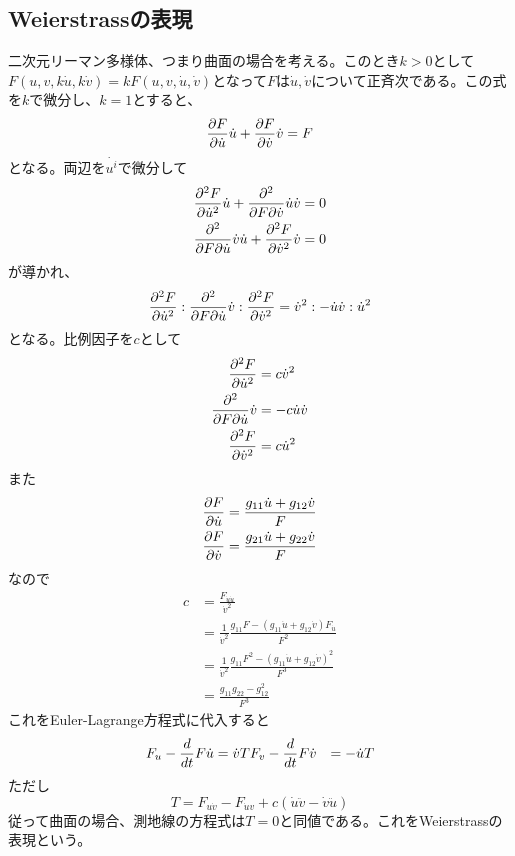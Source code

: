     \subsection{Weierstrassの表現}
        二次元リーマン多様体、つまり曲面の場合を考える。このとき$k > 0$として$F(u,v,k\dot{u},k\dot{v}) = kF(u,v,\dot{u},\dot{v})$となって$F$は$\dot{u},\dot{v}$について正斉次である。この式を$k$で微分し、$k = 1$とすると、
            \[\pd[F]{\dot{u}}\dot{u} + \pd[F]{\dot{v}}\dot{v} = F\]
        となる。両辺を$\dot{u^i}$で微分して
        \begin{align*}
            \pd[^2F]{\dot{u}^2}\dot{u}+\ppd{F}{\dot{v}}{\dot{u}}\dot{v} = 0\\
            \ppd{F}{\dot{u}}{\dot{v}}\dot{u}+\pd[^2F]{\dot{v}^2}\dot{v} = 0\\
        \end{align*}
        が導かれ、
            \[\pd[^2F]{\dot{u}^2} : \ppd{F}{\dot{u}}{\dot{v}} : \pd[^2F]{\dot{v}^2} = \dot{v}^2 : -\dot{u}\dot{v} : \dot{u}^2\]
        となる。比例因子を$c$として
        \begin{align*}
            \pd[^2F]{\dot{u}^2} &= c\dot{v}^2\\
            \ppd{F}{\dot{u}}{\dot{v}} &= -c\dot{u}\dot{v}\\
            \pd[^2F]{\dot{v}^2} &= c\dot{u}^2\\
        \end{align*}
        また
        \begin{align*}
            \pd[F]{\dot{u}} &= \frac{g_{11}\dot{u} + g_{12}\dot{v}}{F}\\
            \pd[F]{\dot{v}} &= \frac{g_{21}\dot{u} + g_{22}\dot{v}}{F}\\
        \end{align*}
        なので
        \begin{align*}
            c &= \frac{F_{\dot{u}\dot{u}}}{\dot{v}^2}\\
            &= \frac{1}{\dot{v}^2}\frac{g_{11}F - (g_{11}\dot{u} + g_{12}\dot{v})F_{\dot{u}}}{F^2}\\
            &= \frac{1}{\dot{v}^2}\frac{g_{11}F^2 - (g_{11}\dot{u} + g_{12}\dot{v})^2}{F^3}\\
            &= \frac{g_{11}g_{22} - g_{12}^2}{F^3}
        \end{align*}
        これをEuler-Lagrange方程式に代入すると
        \begin{align*}
            F_{u} - \de{t}F{\dot{u}} &= \dot{v}T
            F_{v} - \de{t}F{\dot{v}} &= -\dot{u}T
        \end{align*}
        ただし
            \[T = F_{u\dot{v}} - F_{\dot{u}v} + c(\dot{u}\ddot{v} - \dot{v}\ddot{u})\]
        従って曲面の場合、測地線の方程式は$T = 0$と同値である。これをWeierstrassの表現という。
            
